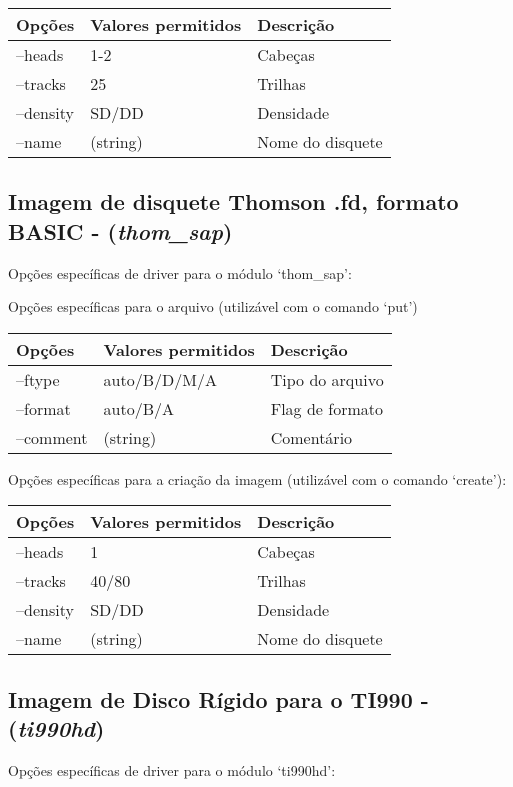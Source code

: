 \documentclass[letterpaper,10pt,brazil]{sphinxmanual}
\begin{document}
\noindent\begin{tabulary}{\linewidth}{|L|L|L|}
\hline

Opções
&
Valores permitidos
&
Descrição
\\
\hline
--heads
&
1-2
&
Cabeças
\\
\hline
--tracks
&
25
&
Trilhas
\\
\hline
--density
&
SD/DD
&
Densidade
\\
\hline
--name
&
(string)
&
Nome do disquete
\\
\hline\end{tabulary}



\subsection{Imagem de disquete Thomson .fd, formato BASIC - (\emph{thom\_sap})}
\label{tools/imgtool:imagem-de-disquete-thomson-fd-formato-basic-thom-sap}
Opções específicas de driver para o módulo `thom\_sap':

Opções específicas para o arquivo (utilizável com o comando `put')

\noindent\begin{tabulary}{\linewidth}{|L|L|L|}
\hline

Opções
&
Valores permitidos
&
Descrição
\\
\hline
--ftype
&
auto/B/D/M/A
&
Tipo do arquivo
\\
\hline
--format
&
auto/B/A
&
Flag de formato
\\
\hline
--comment
&
(string)
&
Comentário
\\
\hline\end{tabulary}


Opções específicas para a criação da imagem (utilizável com o comando `create'):

\noindent\begin{tabulary}{\linewidth}{|L|L|L|}
\hline

Opções
&
Valores permitidos
&
Descrição
\\
\hline
--heads
&
1
&
Cabeças
\\
\hline
--tracks
&
40/80
&
Trilhas
\\
\hline
--density
&
SD/DD
&
Densidade
\\
\hline
--name
&
(string)
&
Nome do disquete
\\
\hline\end{tabulary}



\subsection{Imagem de Disco Rígido para o TI990 - (\emph{ti990hd})}
\label{tools/imgtool:imagem-de-disco-rigido-para-o-ti990-ti990hd}
Opções específicas de driver para o módulo `ti990hd':
\end{document}
